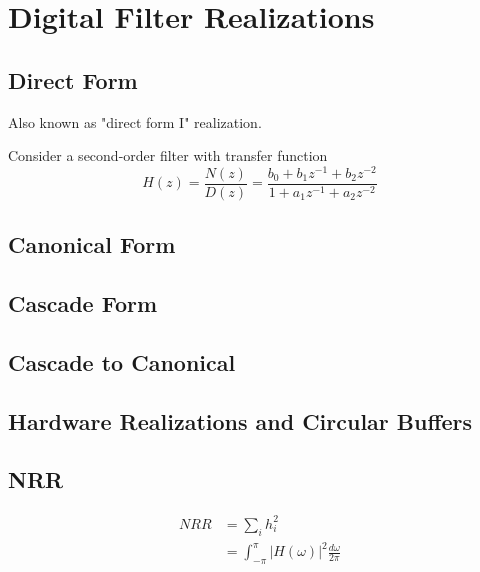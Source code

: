 \section{Digital Filter Realizations}
\subsection{Direct Form}
Also known as "direct form I" realization.

Consider a second-order filter with transfer function
\[
	H(z) = \frac{N(z)}{D(z)} 
		 = \frac{b_0 + b_1z^{-1} + b_2z^{-2}}{1 + a_1z^{-1} + a_2z^{-2}}
\]

\subsection{Canonical Form}
\subsection{Cascade Form}
\subsection{Cascade to Canonical}
\subsection{Hardware Realizations and Circular Buffers}

\subsection{NRR}
\begin{align}
NRR &= \sum_i h_i^2 \\
    &= \int_{-\pi}^{\pi}|H(\omega)|^2 \frac{d\omega}{2\pi}
\end{align}
